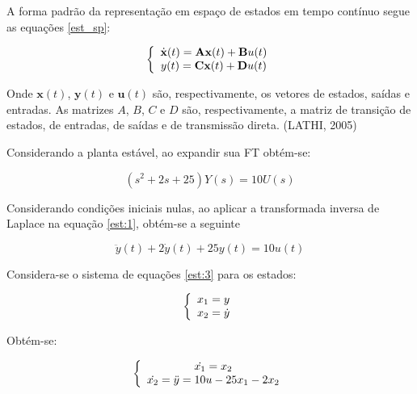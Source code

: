 A forma padrão da representação em espaço de estados em tempo contínuo segue as equações \ref{est_sp}:

\begin{equation} \label{est_sp}
\centering
\left \{
\begin{array}{cc}
\Dot{\textbf{x}}(t) = \textbf{Ax}(t) + \textbf{B}u(t) \\
y(t) = \textbf{Cx}(t) + \textbf{D}u(t)\\
\end{array}
\right.
\end{equation}

Onde $\textbf{x}(t)$, $\textbf{y}(t)$ e $\textbf{u}(t)$ são, respectivamente, os vetores de estados, saídas e entradas. As matrizes $A$, $B$, $C$ e $D$ são, respectivamente, a matriz de transição de estados, de entradas, de saídas e de transmissão direta. (LATHI, 2005)

Considerando a planta estável, ao expandir sua FT obtém-se:

\begin{equation} \label{est:1}
    (s^2+2s+25)Y(s) = 10U(s)
\end{equation}

Considerando condições iniciais nulas, ao aplicar a transformada inversa de Laplace na equação \ref{est:1}, obtém-se a seguinte 

\begin{equation} \label{est:2}
    \ddot{y}(t) + 2\dot{y}(t) + 25y(t) = 10u(t)
\end{equation}

Considera-se o sistema de equações \ref{est:3} para os estados:

\begin{equation} \label{est:3}
\centering
\left \{
\begin{array}{cc}
x_1 = y \\
x_2 = \dot{y}\\
\end{array}
\right.
\end{equation}

Obtém-se:

\begin{equation} \label{est:4}
\centering
\left \{
\begin{array}{cc}
\dot{x_1} = x_2 \\
\dot{x_2} = \ddot{y} = 10u - 25x_1 - 2x_2\\
\end{array}
\right.
\end{equation}

